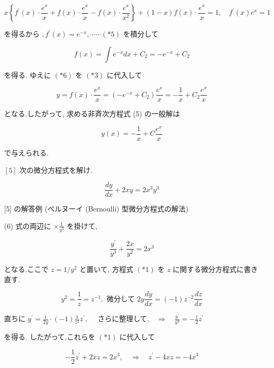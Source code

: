 \documentclass[10pt]{article}
\begin{document}
$$
x\left\{f^{\prime}(x) \cdot \frac{e^{x}}{x}+f(x) \cdot \frac{e^{x}}{x}-f(x) \cdot \frac{e^{x}}{x^{2}}\right\}+(1-x) f(x) \cdot \frac{e^{x}}{x}=1, \quad f^{\prime}(x) e^{x}=1
$$

を得るから $, f^{\prime}(x)=e^{-x}, \cdots \cdots(* 5)$ を積分して


\begin{equation*}
f(x)=\int e^{-x} d x+C_{2}=-e^{-x}+C_{2} \tag{*6}
\end{equation*}


を得る. ゆえに $(* 6)$ を $(* 3)$ に代入して


\begin{equation*}
y=f(x) \cdot \frac{e^{x}}{x}=\left(-e^{-x}+C_{2}\right) \frac{e^{x}}{x}=-\frac{1}{x}+C_{2} \frac{e^{x}}{x} \tag{*7}
\end{equation*}


となる.したがって, 求める非斉次方程式 (5) の一般解は


\begin{equation*}
y(x)=-\frac{1}{x}+C \frac{e^{x}}{x} \tag{*8}
\end{equation*}


で与えられる.

$[5]$ 次の微分方程式を解け.


\begin{equation*}
\frac{d y}{d x}+2 x y=2 x^{3} y^{3} \tag{6}
\end{equation*}


[5] の解答例 (ベルヌーイ (Bernoulli) 型微分方程式の解法)

(6) 式の両辺に $\times \frac{1}{y^{3}}$ を掛けて,


\begin{equation*}
\frac{y^{\prime}}{y^{3}}+\frac{2 x}{y^{2}}=2 x^{3} \tag{*1}
\end{equation*}


となる.ここで $z=1 / y^{2}$ と置いて, 方程式 $(* 1)$ を $z$ に関する微分方程式に書き直す.

$$
y^{2}=\frac{1}{z}=z^{-1}, \text { 微分して } 2 y \frac{d y}{d x}=(-1) z^{-2} \frac{d z}{d x}
$$

直ちに $y^{\prime}=\frac{1}{2 y} \cdot(-1) \frac{1}{z^{2}} z^{\prime}, \quad$ さらに整理して,$\quad \Longrightarrow \quad \frac{y^{\prime}}{y^{3}}=-\frac{1}{2} z^{\prime}$

を得る. したがって,これらを $(* 1)$ に代入して


\begin{equation*}
-\frac{1}{2} z^{\prime}+2 x z=2 x^{3}, \quad \Longrightarrow \quad z^{\prime}-4 x z=-4 x^{3} \tag{*3}
\end{equation*}
\end{document}
